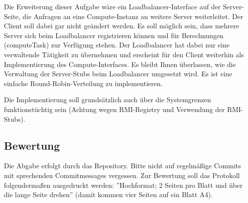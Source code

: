 Die Erweiterung dieser Aufgabe wäre ein Loadbalancer-Interface auf der Server-Seite, die Anfragen an eine Compute-Instanz an weitere Server weiterleitet. Der Client soll dabei gar nicht geändert werden. Es soll möglich sein, dass mehrere Server sich beim Loadbalancer registrieren können und für Berechnungen (computeTask) zur Verfügung stehen. Der Loadbalancer hat dabei nur eine verwaltende Tätigkeit zu übernehmen und erscheint für den Client weiterhin als Implementierung des Compute-Interfaces. Es bleibt Ihnen überlassen, wie die Verwaltung der Server-Stubs beim Loadbalancer umgesetzt wird. Es ist eine einfache Round-Robin-Verteilung zu implementieren.

Die Implementierung soll grundsätzlich auch über die Systemgrenzen funktionstüchtig sein (Achtung wegen RMI-Registry und Verwendung der RMI-Stubs).

\subsection{Bewertung}

Die Abgabe erfolgt durch das Repository. Bitte nicht auf regelmäßige Commits mit sprechenden Commitmessages vergessen. Zur Bewertung soll das Protokoll folgendermaßen ausgedruckt werden: ''Hochformat; 2 Seiten pro Blatt und über die lange Seite drehen'' (damit kommen vier Seiten auf ein Blatt A4).

